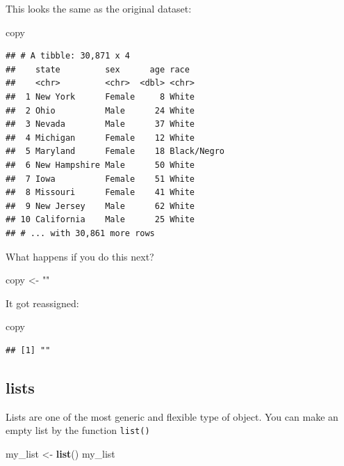\documentclass[]{book}
\newenvironment{Shaded}{\begin{snugshade}}{\end{snugshade}}
\newcommand{\KeywordTok}[1]{\textcolor[rgb]{0.13,0.29,0.53}{\textbf{#1}}}
\newcommand{\StringTok}[1]{\textcolor[rgb]{0.31,0.60,0.02}{#1}}
\newcommand{\NormalTok}[1]{#1}
\theoremstyle{definition}
\theoremstyle{definition}
\theoremstyle{definition}
\theoremstyle{remark}
\begin{document}
This looks the same as the original dataset:

\begin{Shaded}
\begin{Highlighting}[]
\NormalTok{copy}
\end{Highlighting}
\end{Shaded}

\begin{verbatim}
## # A tibble: 30,871 x 4
##    state         sex      age race       
##    <chr>         <chr>  <dbl> <chr>      
##  1 New York      Female     8 White      
##  2 Ohio          Male      24 White      
##  3 Nevada        Male      37 White      
##  4 Michigan      Female    12 White      
##  5 Maryland      Female    18 Black/Negro
##  6 New Hampshire Male      50 White      
##  7 Iowa          Female    51 White      
##  8 Missouri      Female    41 White      
##  9 New Jersey    Male      62 White      
## 10 California    Male      25 White      
## # ... with 30,861 more rows
\end{verbatim}

What happens if you do this next?

\begin{Shaded}
\begin{Highlighting}[]
\NormalTok{copy <-}\StringTok{ ""}
\end{Highlighting}
\end{Shaded}

It got reassigned:

\begin{Shaded}
\begin{Highlighting}[]
\NormalTok{copy}
\end{Highlighting}
\end{Shaded}

\begin{verbatim}
## [1] ""
\end{verbatim}

\subsection{lists}\label{lists}

Lists are one of the most generic and flexible type of object. You can
make an empty list by the function \texttt{list()}

\begin{Shaded}
\begin{Highlighting}[]
\NormalTok{my_list <-}\StringTok{ }\KeywordTok{list}\NormalTok{()}
\NormalTok{my_list}
\end{Highlighting}
\end{Shaded}
\end{document}
